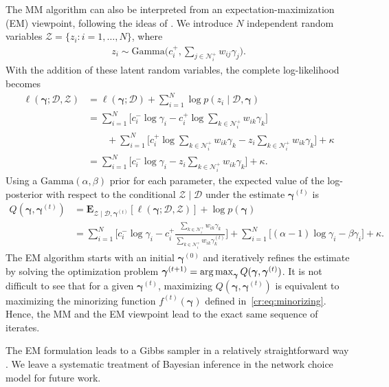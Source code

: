 The MM algorithm can also be interpreted from an expectation-maximization (EM) viewpoint, following the ideas of \citet{caron2012efficient}.
We introduce $N$ independent random variables $\mathcal{Z} = \{ z_i : i = 1, \ldots, N \}$, where
\begin{align*}
z_i \sim \text{Gamma} \bigg( c^+_i, \sum_{j \in \mathcal{N}^+_i} w_{ij} \gamma_j \bigg).
\end{align*}
With the addition of these latent random variables, the complete log-likelihood becomes
\begin{align*}
\ell(\bm{\gamma} ; \mathcal{D}, \mathcal{Z})
    &= \ell(\bm{\gamma}; \mathcal{D}) + \sum_{i = 1}^N \log p(z_i \mid \mathcal{D}, \bm{\gamma}) \\
    &= \sum_{i = 1}^N \bigg[ c^-_i \log \gamma_i - c^+_i \log \sum_{k \in \mathcal{N}^+_i} w_{ik} \gamma_k \bigg] \\
    &\qquad +\sum_{i = 1}^N \bigg[  c^+_i \log \sum_{k \in \mathcal{N}^+_i} w_{ik} \gamma_k - z_i \sum_{k \in \mathcal{N}^+_i} w_{ik} \gamma_k \bigg] + \kappa \\
    &= \sum_{i = 1}^N \bigg[ c^-_i \log \gamma_i - z_i \sum_{k \in \mathcal{N}^+_i} w_{ik} \gamma_k \bigg] + \kappa.
\end{align*}
Using a $\text{Gamma}(\alpha, \beta)$ prior for each parameter, the expected value of the log-posterior with respect to the conditional $\mathcal{Z} \mid \mathcal{D}$ under the estimate $\bm{\gamma}^{(t)}$ is
\begin{align*}
Q(\bm{\gamma}, \bm{\gamma}^{(t)})
    &= \mathbf{E}_{\mathcal{Z} \mid \mathcal{D}, \bm{\gamma}^{(t)}} \left[ \ell(\bm{\gamma} ; \mathcal{D}, \mathcal{Z}) \right]
       + \log p(\bm{\gamma}) \\
    &=\sum_{i = 1}^N \bigg[ c^-_i \log \gamma_i - c^+_i \frac{\sum_{k \in \mathcal{N}^+_i} w_{ik} \gamma_k}{\sum_{k \in \mathcal{N}^+_i} w_{ik} \gamma^{(t)}_k} \bigg]
      + \sum_{i = 1}^N \bigg[ (\alpha -1) \log \gamma_i - \beta \gamma_i \bigg] + \kappa.
\end{align*}
The EM algorithm starts with an initial $\bm{\gamma}^{(0)}$ and iteratively refines the estimate by solving the optimization problem $\bm{\gamma}^{(t+1)} = \operatorname*{arg\,max}_{\bm{\gamma}} Q(\bm{\gamma}, \bm{\gamma}^{(t)})$.
It is not difficult to see that for a given $\bm{\gamma}^{(t)}$, maximizing $Q(\bm{\gamma}, \bm{\gamma}^{(t)})$ is equivalent to maximizing the minorizing function $f^{(t)}(\bm{\gamma})$ defined in~\eqref{cr:eq:minorizing}.
Hence, the MM and the EM viewpoint lead to the exact same sequence of iterates.

The EM formulation leads to a Gibbs sampler in a relatively straightforward way \citep{caron2012efficient}.
We leave a systematic treatment of Bayesian inference in the network choice model for future work.
